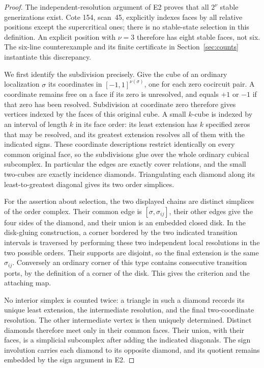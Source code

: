 \documentclass[11pt,a4paper]{article}
\begin{document}
\begin{proof}
The independent-resolution argument of E2 proves that all $2^\nu$ stable
generizations exist. Cote 154, scan~45, explicitly indexes faces by all
relative positions except the supercritical ones; there is no stable-state
selection in this definition. An explicit position with $\nu=3$ therefore
has eight stable faces, not six. The six-line counterexample and its finite
certificate in Section~\ref{sec:counts} instantiate this discrepancy.

We first identify the subdivision precisely. Give the cube of an ordinary
localization $\sigma$ its coordinates in $[-1,1]^{\nu(\sigma)}$, one for
each zero cocircuit pair. A coordinate remains free on a face if its
zero is unresolved, and equals $+1$ or $-1$ if that zero has been
resolved. Subdivision at coordinate zero therefore gives vertices
indexed by the faces of this original cube. A small $k$-cube is indexed
by an interval of length $k$ in its face order: its least extension has
$k$ specified zeros that may be resolved, and its greatest extension
resolves all of them with the indicated signs. These coordinate
descriptions restrict identically on every common original face, so
the subdivisions glue over the whole ordinary cubical subcomplex.
In particular the edges are exactly cover relations, and the small
two-cubes are exactly incidence diamonds. Triangulating each diamond
along its least-to-greatest diagonal gives its two order simplices.

For the assertion about selection, the two displayed chains are distinct
simplices of the order complex. Their common edge is
$[\sigma,\sigma_{ij}]$, their other edges give the four sides of the
diamond, and their union is an embedded closed disk. In the disk-gluing
construction, a corner bordered by the two indicated transition intervals
is traversed by performing these two independent local resolutions in the
two possible orders. Their supports are disjoint, so the final extension
is the same $\sigma_{ij}$. Conversely an ordinary corner of this type
contains consecutive transition ports, by the definition of a corner of
the disk. This gives the criterion and the attaching map.

No interior simplex is counted twice: a triangle in such a diamond records
its unique least extension, the intermediate resolution, and the final
two-coordinate resolution. The other intermediate vertex is then uniquely
determined. Distinct diamonds therefore meet only in their common faces.
Their union, with their faces, is a simplicial subcomplex after adding the
indicated diagonals. The sign involution carries each diamond to its
opposite diamond, and its quotient remains embedded by the sign argument
in E2.


\end{proof}
\end{document}
